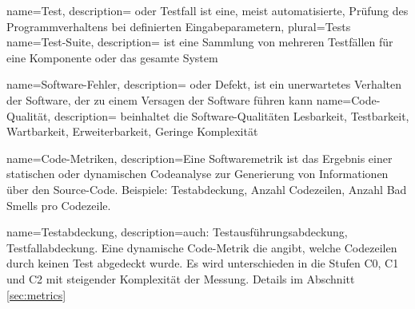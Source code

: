 
 {
  name={Test},
  description= {oder Testfall ist eine, meist automatisierte, Prüfung des Programmverhaltens bei definierten Eingabeparametern},
  plural=Tests
}
 {
  name={Test-Suite},
  description= {ist eine Sammlung von mehreren Testfällen für eine Komponente oder das gesamte System}
}%

 {
  name={Software-Fehler},
  description= {oder Defekt, ist ein unerwartetes Verhalten der Software, der zu einem Versagen der Software führen kann}
}
 {
  name={Code-Qualität},
  description= {beinhaltet die Software-Qualitäten Lesbarkeit, Testbarkeit, Wartbarkeit, Erweiterbarkeit, Geringe Komplexität}
}

 {
  name={Code-Metriken},
  description=Eine Softwaremetrik ist das Ergebnis einer statischen oder dynamischen Codeanalyse zur Generierung von Informationen über den Source-Code. Beispiele: Testabdeckung, Anzahl Codezeilen, Anzahl Bad Smells pro Codezeile.
}

 {
  name=Testabdeckung,
  description={auch: Testausführungsabdeckung, Testfallabdeckung. Eine dynamische Code-Metrik die angibt, welche Codezeilen durch keinen Test abgedeckt wurde. Es wird unterschieden in die Stufen C0, C1 und C2 mit steigender Komplexität der Messung. Details im Abschnitt \ref{sec:metrics}}
}


